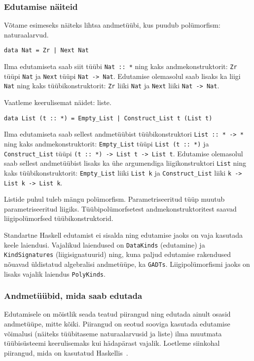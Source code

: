 \documentclass[12pt]{article}
\begin{document}
      \subsubsection{Edutamise näiteid}
        Võtame esimeseks näiteks lihtsa andmetüübi, kus puudub polümorfism: naturaalarvud.

        \begin{verbatim}data Nat = Zr | Next Nat\end{verbatim}

        Ilma edutamiseta saab siit tüübi \verb!Nat :: *! ning kaks andmekonstruktorit: \verb!Zr! tüüpi \verb!Nat! ja \verb!Next! tüüpi \verb!Nat -> Nat!. Edutamise olemasolul saab lisaks ka liigi \verb!Nat! ning kaks tüübikonstruktorit: \verb!Zr! liiki \verb!Nat! ja \verb!Next! liiki \verb!Nat -> Nat!.

        Vaatleme keerulisemat näidet: liste.

        \begin{verbatim}data List (t :: *) = Empty_List | Construct_List t (List t)\end{verbatim}

        Ilma edutamiseta saab sellest andmetüübist tüübikonstruktori \verb!List :: * -> *! ning kaks andmekonstruktorit: \verb!Empty_List! tüüpi \verb!List (t :: *)! ja \verb!Construct_List! tüüpi \verb!(t :: *) -> List t -> List t!. Edutamise olemasolul saab sellest andmetüübist lisaks ka ühe argumendiga liigikonstruktori \verb!List! ning kaks tüübikonstruktorit: \verb!Empty_List! liiki \verb!List k! ja \verb!Construct_List! liiki \verb!k -> List k -> List k!.

        Listide puhul tuleb mängu polümorfism. Parametriseeritud tüüp muutub parametriseeritud liigiks. Tüübipolümorfsetest andmekonstruktoritest saavad liigipolümorfsed tüübikonstruktorid.

        Standartne Haskell edutamist ei sisalda ning edutamise jaoks on vaja kasutada keele laiendusi. Vajalikud laiendused on \verb!DataKinds! (edutamine) ja \verb!KindSignatures! (liigisignatuurid) ning, kuna paljud edutamise rakendused nõuavad üldistatud algebralisi andmetüüpe, ka \verb!GADTs!. Liigipolümorfismi jaoks on lisaks vajalik laiendus \verb!PolyKinds!.
      \subsubsection{Andmetüübid, mida saab edutada}\label{kitsendused}
        Edutamisele on mõistlik seada teatud piirangud ning edutada ainult osasid andmetüüpe, mitte kõiki. Piirangud on seotud sooviga kasutada edutamise võimalusi (näiteks tüübitaseme naturaalarvusid ja liste) ilma muutmata tüübisüsteemi keerulisemaks kui hädapärast vajalik. Loetleme siinkohal piirangud, mida on kasutatud Haskellis~\cite{Giv}.
\end{document}
